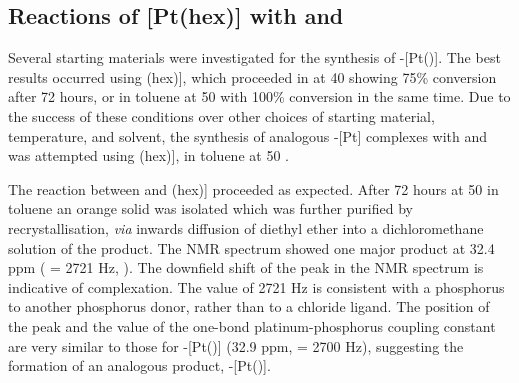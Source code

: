 
\subsection[Reactions with \texorpdfstring{[Pt\ce{Cl2}(\acrshort{hex}){]}} P]{Reactions of \texorpdfstring{[Pt(hex){]}} P with \tBusixantphos{} and \tBuxantphos{}}

Several starting materials were investigated for the synthesis of \trans-[Pt(\tButhixantphos)]. The best results occurred using \ce{[PtCl2}(\acrshort{hex})], which proceeded in  at 40 \degC{} showing 75\% conversion after 72 hours, or in toluene at 50\degC{} with 100\% conversion in the same time.  Due to the success of these conditions over other choices of starting material, temperature, and solvent, the synthesis of analogous \trans-[Pt] complexes with \tBusixantphos{} and \tBuxantphos{} was attempted using \ce{[PtCl2}(\acrshort{hex})], in toluene at 50 \degC{}.  

The reaction between \tBuxantphos{} and \ce{[PtCl2}(\acrshort{hex})] proceeded as expected.  After 72 hours at 50\degC{} in toluene an orange solid was isolated which was further purified by recrystallisation, \emph{via} inwards diffusion of diethyl ether into a dichloromethane solution of the product.  The \phosphorus{} NMR spectrum showed one major product at 32.4 ppm (\JPtP{} = 2721 Hz, ).  The downfield shift of the peak in the \phosphorus{} NMR spectrum is indicative of complexation.   The value of 2721 Hz is consistent with a phosphorus \trans{} to another phosphorus donor, rather than \trans{} to a chloride ligand.\cite{Rigamonti2010, Appleton1978, Pregosin1980}  The position of the peak and the value of the one-bond platinum-phosphorus coupling constant are very similar to those for \trans-[Pt(\tButhixantphos)] (32.9 ppm, \JPtP{} = 2700 Hz), suggesting the formation of an analogous product, \trans-[Pt(\tBuxantphos)].

